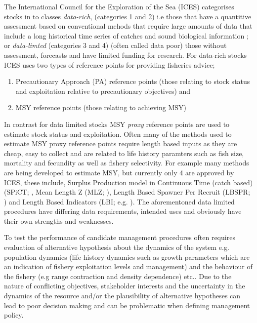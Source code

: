 \documentclass[preprint,12pt]{elsarticle}
\begin{document}
The International Council for the Exploration of the Sea (ICES) categorises stocks in to classes \emph{data-rich}, (categories 1 and 2) i.e those that have a quantitive assessment based on conventional mehods that require large amounts of data that include a long historical time series of catches and sound biological information \cite{bentley2015data}; or \emph{data-limted} \cite{costello2012status}(categories 3 and 4) (often called data poor) those without assessment, forecasts and have limited funding for research. For data-rich stocks ICES uses two types of reference points for providing fisheries advice; 
\begin{enumerate}
  \item Precautionary Approach (PA) reference points (those relating to stock status and exploitation relative to precautionary objectives) and 
  \item MSY reference points (those relating to achieving MSY) 
\end{enumerate}
In contrast for data limited stocks MSY \emph{proxy} reference points are used to estimate stock status and exploitation.  Often many of the methods used to estimate MSY proxy reference points require length based inputs as they are cheap, easy to collect \cite{quinn1999quantitative} and are related to life history paramters such as fish size, mortality and fecundity as well as fishery selectivity. For example many methods are being developed to estimate MSY, but currently only 4 are approved by ICES, these include, Surplus Production model in Continuous Time (catch based) (SPiCT; \cite{pedersen2017stochastic}, Mean Length Z (MLZ; \cite{gedamke2006estimating}), Length Based Spawner Per Recruit (LBSPR; \cite{hordyk2014some}) and Length Based Indicators (LBI; e.g. \cite{probst2013indicator}). The aforementoned data limited procedures have differing data requirements, intended uses and obviously have their own strengths and weaknesses. 

To test the performance of candidate management procedures often requires evaluation of alternative hypothesis about the dynamics of the system e.g. population dynamics (life history dynamics such as growth parameters which are an indication of fishery exploitation levels and management) and the behaviour of the fishery (e.g range contraction and density dependence) etc.. Due to the nature of conflicting objectives, stakeholder interests and the uncertainty in the dynamics of the resource and/or the plausibility of alternative hypotheses can lead to poor decision making and can be problematic when defining management policy.
\end{document}

